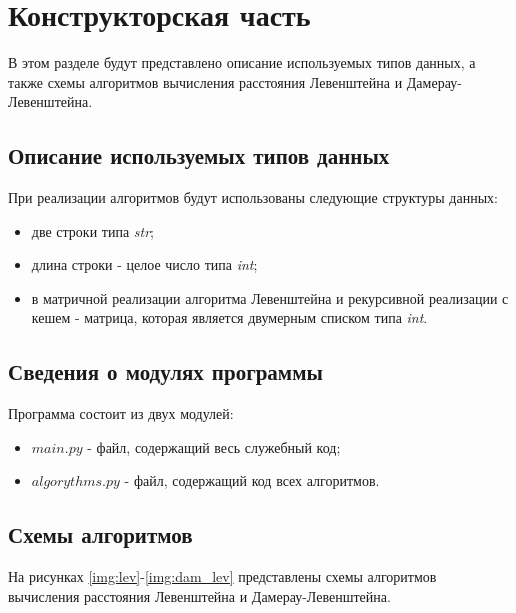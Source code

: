\chapter{Конструкторская часть}
В этом разделе будут представлено описание используемых типов данных, а также схемы алгоритмов вычисления расстояния Левенштейна и Дамерау-Левенштейна.

\section{Описание используемых типов данных}
При реализации алгоритмов будут использованы следующие структуры данных:

\begin{itemize}
    \item две строки типа \textit{str};
    \item длина строки - целое число типа \textit{int};
    \item в матричной реализации алгоритма Левенштейна и рекурсивной реализации с кешем - матрица, которая является двумерным списком типа \textit{int}. 
\end{itemize}


\section{Сведения о модулях программы}
Программа состоит из двух модулей:
\begin{itemize}
	\item $main.py$ - файл, содержащий весь служебный код;
    \item $algorythms.py$ - файл, содержащий код всех алгоритмов. \newline
\end{itemize}


\section{Схемы алгоритмов}
На рисунках \ref{img:lev}-\ref{img:dam_lev} представлены схемы алгоритмов вычисления расстояния Левенштейна и Дамерау-Левенштейна.


